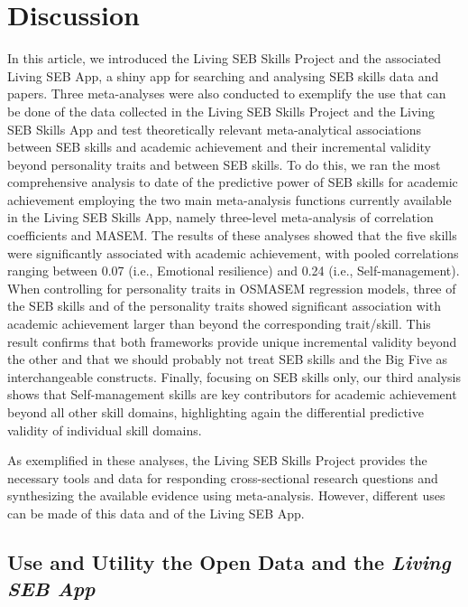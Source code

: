 \documentclass[
  man,
  longtable,
  nolmodern,
  notxfonts,
  notimes,
  colorlinks=true,linkcolor=blue,citecolor=blue,urlcolor=blue]{apa7}
\begin{document}
\section{Discussion}\label{discussion}

In this article, we introduced the Living SEB Skills Project and the
associated Living SEB App, a shiny app for searching and analysing SEB
skills data and papers. Three meta-analyses were also conducted to
exemplify the use that can be done of the data collected in the Living
SEB Skills Project and the Living SEB Skills App and test theoretically
relevant meta-analytical associations between SEB skills and academic
achievement and their incremental validity beyond personality traits and
between SEB skills. To do this, we ran the most comprehensive analysis
to date of the predictive power of SEB skills for academic achievement
employing the two main meta-analysis functions currently available in
the Living SEB Skills App, namely three-level meta-analysis of
correlation coefficients and MASEM. The results of these analyses showed
that the five skills were significantly associated with academic
achievement, with pooled correlations ranging between 0.07 (i.e.,
Emotional resilience) and 0.24 (i.e., Self-management). When controlling
for personality traits in OSMASEM regression models, three of the SEB
skills and of the personality traits showed significant association with
academic achievement larger than \textbar{} beyond the
corresponding trait/skill. This result confirms that both frameworks
provide unique incremental validity beyond the other and that we should
probably not treat SEB skills and the Big Five as interchangeable
constructs. Finally, focusing on SEB skills only, our third analysis
shows that Self-management skills are key contributors for academic
achievement beyond all other skill domains, highlighting again the
differential predictive validity of individual skill domains.

As exemplified in these analyses, the Living SEB Skills Project provides
the necessary tools and data for responding cross-sectional research
questions and synthesizing the available evidence using meta-analysis.
However, different uses can be made of this data and of the Living SEB
App.

\subsection{\texorpdfstring{Use and Utility the Open Data and the
\emph{Living SEB
App}}{Use and Utility the Open Data and the Living SEB App}}\label{use-and-utility-the-open-data-and-the-living-seb-app}
\end{document}
